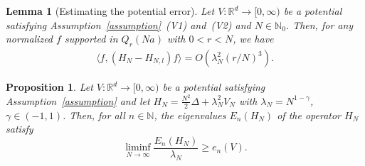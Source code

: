 \documentclass[10pt,a4paper]{amsart}
\newtheorem{proposition}{Proposition}
\newtheorem{lemma}{Lemma}
\newcommand{\N}{{\mathbb N}}
\newcommand{\R}{{\mathbb R}}
\begin{document}
\begin{lemma}[Estimating the potential error]\label{lem:potential_difference}
    Let $V:\R^d\to [0,\infty)$ be a potential satisfying Assumption~\ref{assumption}~(V1) and~(V2) and $N\in \N_0$. Then, for any normalized $f$ supported in $Q_{r}(Na)$ with $0<r<N$, we have
    \begin{align*}
       \langle f, (H_N-H_{N,l})f\rangle = O(\lambda_N^2(r/N)^3).
    \end{align*}
\end{lemma}

\begin{proposition}\label{prop:lower_bound_general_potentials}
    Let $V:\R^d\to [0,\infty)$ be a potential satisfying Assumption~\ref{assumption} and let $H_N=\frac{N^2}2\Delta + \lambda_N^2 V_N$ with $\lambda_N=N^{1-\gamma}$, $\gamma\in(-1,1)$. Then, for all  $n\in \N$,  the eigenvalues $E_{n}(H_N)$ of the operator $H_{N}$ satisfy
    $$\liminf_{N\to \infty}\frac{E_{n}(H_N)}{\lambda_N} \ge   e_n(V).$$ 
\end{proposition}
\end{document}

